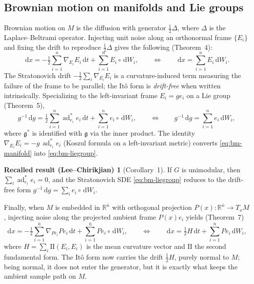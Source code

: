 \documentclass[11pt]{article}
\theoremstyle{plain}
\theoremstyle{definition}
\newtheorem*{recall}{Recalled result (Lee--Chirikjian)}
\newcommand{\g}{\mathfrak{g}}
\newcommand{\gstar}{\mathfrak{g}^{*}}
\newcommand{\adstar}{\operatorname{ad}^{*}}
\newcommand{\cd}{\,\mathrm{d}}          %
\newcommand{\dW}{\,\mathrm{d}W}
\newcommand{\dt}{\,\mathrm{d}t}
\newcommand{\Strat}{\circ\,\mathrm{d}W}
\newcommand{\R}{\mathbb{R}}
\newcommand{\half}{\tfrac{1}{2}}
\begin{document}
\subsection{Brownian motion on manifolds and Lie groups}

Brownian motion on $M$ is the diffusion with generator $\half\Delta$, where
$\Delta$ is the Laplace--Beltrami operator. Injecting unit noise along an
orthonormal frame $\{E_i\}$ and fixing the drift to reproduce $\half\Delta$ gives
the following (Theorem~4):
\begin{equation}
  \cd x = -\half\sum_{i=1}^n \nabla_{E_i}E_i\dt + \sum_{i=1}^n E_i\Strat_i,
  \qquad\Longleftrightarrow\qquad
  \cd x = \sum_{i=1}^n E_i\dW_i .
  \label{eq:bm-manifold}
\end{equation}
The Stratonovich drift $-\half\sum_i\nabla_{E_i}E_i$ is a curvature-induced term
measuring the failure of the frame to be parallel; the It\^o form is
\emph{drift-free} when written intrinsically. Specializing to the left-invariant
frame $E_i=ge_i$ on a Lie group (Theorem~5),
\begin{equation}
  g^{-1}\cd g = \half\sum_{i=1}^n \adstar_{e_i}e_i\dt + \sum_{i=1}^n e_i\Strat_i,
  \qquad\Longleftrightarrow\qquad
  g^{-1}\cd g = \sum_{i=1}^n e_i\dW_i,
  \label{eq:bm-liegroup}
\end{equation}
where $\gstar$ is identified with $\g$ via the inner product. The identity
$\nabla_{E_i}E_i=-g\,\adstar_{e_i}e_i$ (Koszul formula on a left-invariant
metric) converts \eqref{eq:bm-manifold} into \eqref{eq:bm-liegroup}.

\begin{recall}[Corollary~1]
If $G$ is unimodular, then $\sum_i\adstar_{e_i}e_i=0$, and the Stratonovich SDE
\eqref{eq:bm-liegroup} reduces to the drift-free form
$g^{-1}\cd g=\sum_i e_i\Strat_i$.
\end{recall}

Finally, when $M$ is embedded in $\R^{\bar n}$ with orthogonal projection
$P(x)\colon\R^{\bar n}\to T_xM$, injecting noise along the projected ambient
frame $P(x)e_i$ yields (Theorem~7)
\begin{equation}
  \cd x = -\half\sum_{i=1}^{\bar n}\nabla_{Pe_i}Pe_i\dt+\sum_{i=1}^{\bar n}Pe_i\Strat_i,
  \qquad\Longleftrightarrow\qquad
  \cd x = \half H\dt + \sum_{i=1}^{\bar n}Pe_i\dW_i,
  \label{eq:bm-embedded}
\end{equation}
where $H=\sum_i \mathrm{II}(E_i,E_i)$ is the mean curvature vector and
$\mathrm{II}$ the second fundamental form. The It\^o form now carries the drift
$\half H$, purely normal to $M$; being normal, it does not enter the generator,
but it is exactly what keeps the ambient sample path on $M$.
\end{document}
